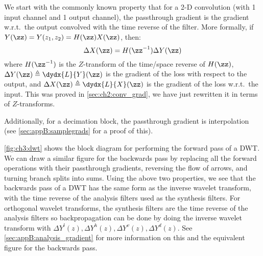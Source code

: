 We start with the commonly known property that for a 2-D convolution (with
1 input channel and 1 output channel), the
passthrough gradient is the gradient w.r.t.\ the output
convolved with the time reverse of the filter. More formally, if
$Y(\zz) = Y(z_1, z_2) = H(\zz) X(\zz)$, then:
%
\begin{equation}\label{eq:ch3:backprop}
  \Delta X(\zz) = H(\zz^{-1}) \Delta Y(\zz)
\end{equation}
%
where $H(\zz^{-1})$ is the $Z$-transform of the time/space reverse of $H(\zz)$,
$\Delta Y(\zz) \triangleq \dydx{L}{Y}(\zz)$ is the gradient of the loss with respect
to the output, and $\Delta X(\zz) \triangleq \dydx{L}{X}(\zz)$ is the gradient of
the loss w.r.t.\ the input. This was proved in \autoref{sec:ch2:conv_grad}, we
have just rewritten it in terms of $Z$-transforms.

Additionally, for a decimation block, the passthrough gradient is
interpolation (see \autoref{sec:appB:samplegrads}
for a proof of this).

\autoref{fig:ch3:dwt} shows the block diagram for performing the forward pass of
a DWT\@. We can draw a similar figure for the backwards pass by replacing all the
forward operations with their passthrough gradients, reversing the flow of
arrows, and turning branch splits into sums. Using the above two
properties, we see that the backwards pass of a DWT has the same form as
the inverse wavelet transform, with the time reverse of the analysis filters
used as the synthesis filters. For orthogonal wavelet transforms, the synthesis
filters are the time reverse of the analysis filters so backpropagation can be
done by doing the inverse wavelet transform with $\Delta Y^l(z), \Delta Y^h(z),
\Delta Y^v(z), \Delta Y^d(z)$. 
See \autoref{sec:appB:analysis_gradient} for more information on this
and the equivalent figure for the backwards pass.

